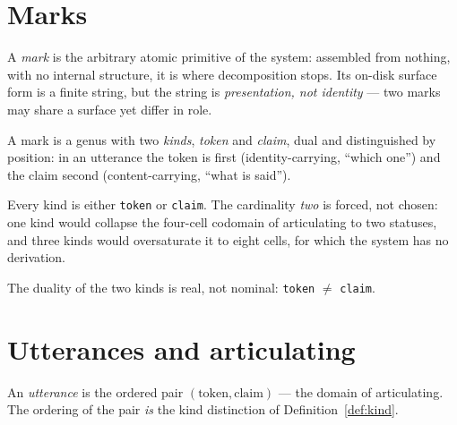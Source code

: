 \section{Marks}

\begin{definition}[Mark]
  \label{def:mark}
  \leanok
  A \emph{mark} is the arbitrary atomic primitive of the system: assembled from
  nothing, with no internal structure, it is where decomposition stops. Its on-disk
  surface form is a finite string, but the string is \emph{presentation, not
  identity} --- two marks may share a surface yet differ in role.
\end{definition}

\begin{definition}[Kind]
  \label{def:kind}
  \leanok
  A mark is a genus with two \emph{kinds}, \emph{token} and \emph{claim}, dual and
  distinguished by position: in an utterance the token is first (identity-carrying,
  ``which one'') and the claim second (content-carrying, ``what is said'').
\end{definition}

\begin{lemma}
  \label{lem:two-kinds}
  \leanok
  Every kind is either \texttt{token} or \texttt{claim}. The cardinality \emph{two}
  is forced, not chosen: one kind would collapse the four-cell codomain of
  articulating to two statuses, and three kinds would oversaturate it to eight cells,
  for which the system has no derivation.
\end{lemma}

\begin{lemma}
  \label{lem:token-ne-claim}
  \leanok
  The duality of the two kinds is real, not nominal: \texttt{token} $\neq$
  \texttt{claim}.
\end{lemma}

\section{Utterances and articulating}

\begin{definition}[Utterance]
  \label{def:utterance}
  \leanok
  An \emph{utterance} is the ordered pair $(\text{token}, \text{claim})$ --- the
  domain of articulating. The ordering of the pair \emph{is} the kind distinction of
  Definition~\ref{def:kind}.
\end{definition}

